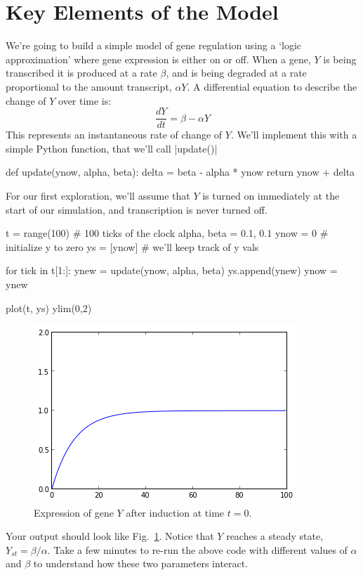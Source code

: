 
\section{Key Elements of the Model}


We're going to build a simple model of gene regulation using a `logic approximation' where gene expression is either on or off.  When a gene, $Y$ is being transcribed it is produced at a rate $\beta$, and is being degraded at a rate proportional to the amount transcript, $\alpha Y$. A differential equation to describe the change of $Y$ over time is:
\[
\frac{dY}{dt} = \beta - \alpha Y
\]
%
This represents an instantaneous rate of change of $Y$. We'll implement this with a simple Python function, that we'll call |update()|
%
\begin{python}
def update(ynow, alpha, beta):
    delta = beta - alpha * ynow
    return ynow + delta
\end{python}
%

For our first exploration, we'll assume that $Y$ is turned on immediately at the start of our simulation, and transcription is never turned off.
%
\begin{python}
t = range(100)  # 100 ticks of the clock
alpha, beta = 0.1, 0.1
ynow = 0  # initialize y to zero
ys = [ynow] # we'll keep track of y vals

for tick in t[1:]:
    ynew = update(ynow, alpha, beta)
    ys.append(ynew)
    ynow = ynew

plot(t, ys)
ylim(0,2)
\end{python}
%
\begin{figure}[!ht]
    \centering
    \includegraphics[width=0.33\columnwidth]{./figures/hands-on12/fig-simpleon.png}
    \caption{Expression of gene $Y$ after induction at time $t=0$.}\label{fig:simpleon}
\end{figure}
%
Your output should look like Fig.~\ref{fig:simpleon}. Notice that $Y$ reaches a steady state, $Y_{st} = \beta/\alpha$.  Take a few minutes to re-run the above code with different values of $\alpha$ and $\beta$ to understand how these two parameters interact.


